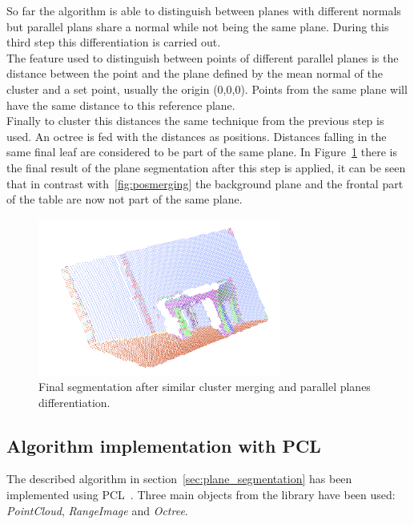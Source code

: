 \documentclass[fontsize=12pt]{article}
\begin{document}
So far the algorithm is  able to distinguish between planes with different normals but parallel plans share a normal while not being the same plane. During this third step this differentiation is carried out.\\


The feature used to distinguish between points of different parallel planes is the distance between the point and the plane defined by the mean normal of the cluster and a set point, usually the origin (0,0,0). Points from the same plane will have the same distance to this reference plane.\\

Finally to cluster this distances the same technique from the previous step is used. An octree is fed with the distances as positions. Distances falling in the same final leaf are considered to be part of the same plane. In Figure~\ref{fig:final_segmentation} there is the final result of the plane segmentation after this step is applied, it can be seen that in contrast with~\ref{fig:posmerging} the background plane and the frontal part of the table are now not part of the same plane.\\

\begin{figure}[!htbp]
  \begin{center}
    \includegraphics[width=8cm]{./images/finalSegmentation.png}
    \caption{Final segmentation after similar cluster merging and parallel planes differentiation.}
    \label{fig:final_segmentation}
  \end{center}
\end{figure}


\subsection{Algorithm implementation with PCL}
\label{sub:algorithm_implementation_with_pcl}

The described algorithm in section~\ref{sec:plane_segmentation} has been implemented using PCL~\cite{bib:pcl}. Three main objects from the library have been used: \textit{PointCloud}, \textit{RangeImage} and \textit{Octree}.\\
\end{document}
